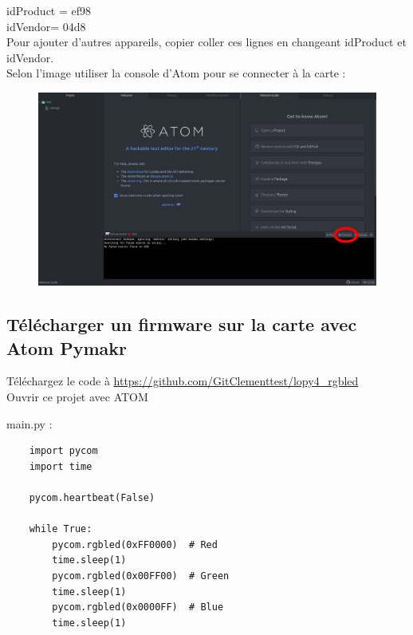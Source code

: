 \documentclass{article}
\begin{document}
idProduct = ef98\\
idVendor= 04d8\\

Pour ajouter d'autres appareils, copier coller ces lignes en changeant idProduct et idVendor. \\


Selon l'image utiliser la console d'Atom pour se connecter à la carte :



  \begin{figure}[H]
\begin{center}
\advance\leftskip-3cm
\advance\rightskip-3cm
\includegraphics[keepaspectratio=true,scale=0.3]{atom_connect.png}
\label{visina8}
\end{center}\end{figure}


\subsection{Télécharger un firmware sur la carte avec Atom Pymakr}
Téléchargez le code à \url{https://github.com/GitClementtest/lopy4_rgbled} \\

Ouvrir ce projet avec ATOM

main.py :
 \begin{verbatim}
    import pycom
    import time

    pycom.heartbeat(False)

    while True:
        pycom.rgbled(0xFF0000)  # Red
        time.sleep(1)
        pycom.rgbled(0x00FF00)  # Green
        time.sleep(1)
        pycom.rgbled(0x0000FF)  # Blue
        time.sleep(1)
        
    \end{verbatim}
\end{document}
